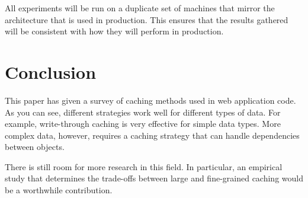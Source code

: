 \documentclass[12pt]{ucthesis}
\begin{document}
All experiments will be run on a duplicate set of machines that mirror the architecture that is used in production.
This ensures that the results gathered will be consistent with how they will perform in production.

\chapter{Conclusion}
\label{conclusion}
This paper has given a survey of caching methods used in web application code.
As you can see, different strategies work well for different types of data.
For example, write-through caching is very effective for simple data types.
More complex data, however, requires a caching strategy that can handle dependencies between objects.

There is still room for more research in this field.
In particular, an empirical study that determines the trade-offs between large and fine-grained caching would be a worthwhile contribution.



\clearpage


\end{document}
